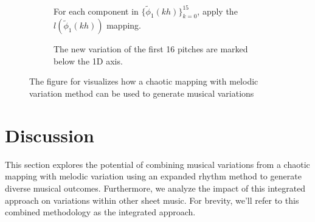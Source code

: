 \documentclass[11pt]{article}
\theoremstyle{definition}
\begin{document}
\begin{figure}
\begin{subfigure}{\textwidth}
{}
  \caption{For each component in $\{\tilde{\phi}_1(kh)\}_{k=0}^{15}$, apply the $l(\tilde{\phi}_1(kh))$ mapping.}
  \label{subfig2:traj2nmp}

\end{subfigure}

\vspace{5pt}

\begin{subfigure}{\textwidth}
  \centering
  \small{
  }
  \caption{The new variation of the first 16 pitches are marked below the 1D axis.}
  \label{subfig2:nmp}

\end{subfigure}

\caption{The figure for visualizes how a chaotic mapping with melodic variation method can be used to generate musical variations}
\label{fig2:dabbymv method}
\end{figure}

\section{Discussion}
\label{sec: discussion}
This section explores the potential of combining musical variations from a chaotic mapping with melodic variation using an expanded rhythm method to generate diverse musical outcomes. Furthermore, we analyze the impact of this integrated approach on variations within other sheet music. For brevity, we'll refer to this combined methodology as the integrated approach. 
\end{document}

